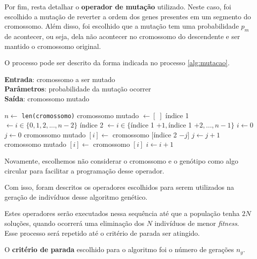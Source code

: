\documentclass[a4paper, 12pt]{article}
\newenvironment{brprocess}[1][]
  {\begin{algorithm}[#1]
     \selectlanguage{brazilian}%
     \floatname{algorithm}{Processo}%
     \renewcommand{\algorithmicif}{\textbf{se}}%
     \renewcommand{\algorithmicfor}{\textbf{para}}%
     \renewcommand{\algorithmicdo}{\textbf{faça}}%
     \renewcommand{\algorithmicthen}{\textbf{faça}}%
     \renewcommand{\algorithmicend}{\textbf{fim}}%
     \renewcommand{\algorithmicwhile}{\textbf{enquanto}}%
     \renewcommand{\algorithmicelse}{\textbf{caso contrário}}%
  }
  {\end{algorithm}}
\begin{document}
Por fim, resta detalhar o \textbf{operador de mutação} utilizado. Neste caso, foi escolhido a mutação de reverter a ordem dos genes presentes em um segmento do cromossomo. Além disso, foi escolhido que a mutação tem uma probabilidade $p_m$ de acontecer, ou seja, dela não acontecer no cromossomo do descendente e ser mantido o cromossomo original.

O processo pode ser descrito da forma indicada no processo \ref{alg:mutacao}.
\begin{brprocess}[!ht]
    \cprotect\caption{Operador de mutação (\verb|mutacao_reversao(cromossomo)|)}
    \textbf{Entrada}: cromossomo a ser mutado\\
    \textbf{Parâmetros}: probabilidade da mutação ocorrer\\
    \textbf{Saída}: cromossomo mutado
    \begin{algorithmic}
            \State $n \gets $ \verb|len(cromossomo)|
            \State cromossomo mutado $\gets [\;]$
            \State índice 1 $\gets i \in \{0, 1, 2, ..., n - 2\}$
            \State índice 2 $\gets i \in \{$índice 1 $+ 1, $índice 1 $+ 2, ..., n - 1\}$
            \State $i \gets 0$
            \State $j \gets 0$
                    \State cromossomo mutado $[i] \gets$ cromossomo $[$índice 2 $- j]$
                    \State $j \gets j + 1$
                \Else
                    \State cromossomo mutado $[i] \gets$ cromossomo $[i]$
                \EndIf
                \State$i \gets i + 1$
        \EndWhile
    \end{algorithmic}
    \label{alg:mutacao}
\end{brprocess}

Novamente, escolhemos não considerar o cromossomo e o genótipo como algo circular para facilitar a programação desse operador.

Com isso, foram descritos os operadores escolhidos para serem utilizados na geração de indivíduos desse algoritmo genético.

Estes operadores serão executados nessa sequência até que a população tenha $2N$ soluções, quando ocorrerá uma eliminação dos $N$ indivíduos de menor \textit{fitness}. Esse processo será repetido até o critério de parada ser atingido. 

O \textbf{critério de parada} escolhido para o algoritmo foi o número de gerações $n_g$. 
\end{document}
